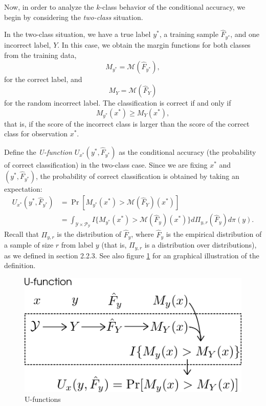Now, in order to analyze the $k$-class behavior of the conditional
accuracy, we begin by considering the \emph{two-class} situation.

In the two-class situation, we have a true label $y^*$, a training
sample $\hat{F}_{y^*}$, and one incorrect label, $Y$.  
In this case, we obtain the margin functions for both classes from the training data,
\[
M_{y^*} = \mathcal{M}(\hat{F}_{y^*}),
\]
for the correct label,
and
\[
M_Y = \mathcal{M}(\hat{F}_Y)
\]
for the random incorrect label.  The classification is correct if and
only if \[M_{y^*}(x^*) \geq M_Y(x^*),\] that is, if the score of the
incorrect class is larger than the score of the correct class for
observation $x^*$.

Define the \emph{U-function} $U_{x^*}(y^*, \hat{F}_{y^*})$ as the
conditional accuracy (the probability of correct classification) in
the two-class case.  Since we are fixing $x^*$ and $(y^*,
\hat{F}_{y^*})$, the probability of correct classification is obtained
by taking an expectation:
\begin{align}\label{eq:U_function}
U_{x^*}(y^*, \hat{F}_{y^*}) &= \Pr[M_{y^*}(x^*) > \mathcal{M}(\hat{F}_Y)(x^*)]
\\&= \int_{\mathcal{Y} \times \mathcal{P}_{\mathcal{Y}}} 
I\{
M_{y^*}(x^*) > \mathcal{M}(\hat{F}_{y})(x^*)
\}
d\Pi_{y, r}(\hat{F}_y)
d\pi(y).
\end{align}
Recall that $\Pi_{y,r}$ is the distribution of $\hat{F}_y$, where
$\hat{F}_y$ is the empirical distribution of a sample of size $r$ from
label $y$ (that is, $\Pi_{y,r}$ is a distribution over distributions), as we defined in section 2.2.3.
See also figure \ref{fig:U_function} for an graphical illustration of
the definition.

\begin{figure}[h]
\centering
\includegraphics[scale = 0.4]{../extrapolation_figures/U_function.png}
\caption{U-functions}\label{fig:U_function}
\end{figure}

